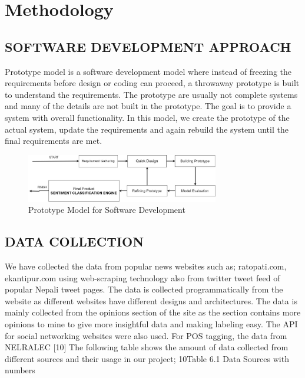     \chapter{Methodology}
       \section{SOFTWARE DEVELOPMENT APPROACH}
Prototype model is a software development model where instead of freezing the
requirements before design or coding can proceed, a throwaway prototype is built to
understand the requirements. The prototype are usually not complete systems and many
of the details are not built in the prototype. The goal is to provide a system with overall
functionality. In this model, we create the prototype of the actual system, update the
requirements and again rebuild the system until the final requirements are met.
        \begin{figure}[hbt!]
            \centering
                \includegraphics[width=0.75\textwidth]{./img/6.1.jpg}
                \caption{Prototype Model for Software Development}
        \end{figure}
        \section{DATA COLLECTION}
We have collected the data from popular news websites such as; ratopati.com,
ekantipur.com using web-scraping technology also from twitter tweet feed of popular
Nepali tweet pages. The data is collected programmatically from the website as
different websites have different designs and architectures. The data is mainly collected
from the opinions section of the site as the section contains more opinions to mine to
give more insightful data and making labeling easy. The API for social networking
websites were also used.
For POS tagging, the data from NELRALEC [10] The following table shows the amount
of data collected from different sources and their usage in our project;
10Table 6.1 Data Sources with numbers\\

